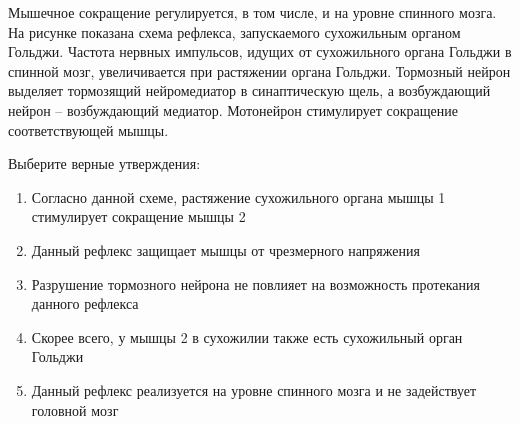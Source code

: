 
Мышечное
сокращение регулируется, в том числе, и на уровне спинного мозга. На рисунке
показана схема рефлекса, запускаемого сухожильным органом Гольджи. Частота
нервных импульсов, идущих от сухожильного органа Гольджи в спинной мозг,
увеличивается при растяжении органа Гольджи. Тормозный нейрон выделяет
тормозящий нейромедиатор в синаптическую щель, а возбуждающий нейрон –
возбуждающий медиатор. Мотонейрон стимулирует сокращение соответствующей мышцы.


Выберите
верные утверждения:

\begin{enumerate}
    \item Согласно данной схеме, растяжение сухожильного органа мышцы 1 стимулирует сокращение мышцы 2
    \item Данный рефлекс защищает мышцы от чрезмерного напряжения
    \item Разрушение тормозного нейрона не повлияет на возможность протекания данного рефлекса
    \item Скорее всего, у мышцы 2 в сухожилии также есть сухожильный орган Гольджи
    \item Данный рефлекс реализуется на уровне спинного мозга и не задействует головной мозг
\end{enumerate}

